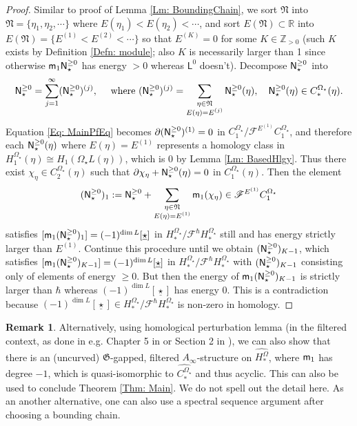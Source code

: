 \documentclass[10pt]{amsart}
\numberwithin{equation}{section}
\theoremstyle{plain}
\theoremstyle{definition}
\newtheorem{remark}[theorem]{Remark}
\theoremstyle{remark}
\numberwithin{equation}{section}
\newcommand{\R}{\mathbb{R}}
\newcommand{\Z}{\mathbb{Z}}
\newcommand{\wh}[1]{\widehat{#1}}
\newcommand{\mf}[1]{\mathfrak{#1}}
\newcommand{\ms}[1]{\mathscr{#1}}
\newcommand{\CBa}{C_*^{\Omega_\star}}
\newcommand{\HBa}{H_*^{\Omega_\star}}
\newcommand{\Cba}[1]{C_{#1}^{\Omega_\star}}
\newcommand{\Hba}[1]{H_{#1}^{\Omega_\star}}
\newcommand{\mm}{\textup{\textsf{m}}}
\newcommand{\NNN}{\textup{\textsf{N}}_\star}
\newcommand{\LL}{\textsf{L}}
\begin{document}
{\begin{proof}
	
	Similar to proof of Lemma \ref{Lm: BoundingChain}, we sort $\mf{N}$ into $\mf{N}=\{\eta_1,\eta_2,\cdots\}$ where $E(\eta_1)<E(\eta_2)<\cdots$, and sort $E(\mf{N})\subset \R$ into $E(\mf{N}) = \{E^{(1)}<E^{(2)}<\cdots \}$ so that $E^{(K)}=0$ for some $K\in\Z_{>0}$ (such $K$ exists by Definition \ref{Defn: module}; also $K$ is necessarily larger than 1 since otherwise $\mm_1\NNN^{\geq 0}$ has energy $>0$ whereas $\LL^0$ doesn't).
	Decompose $\NNN^{\geq 0}$ into \begin{align*}
		\NNN^{\geq 0} = \sum_{j=1}^\infty (\NNN^{\geq 0})^{(j)},\quad 
		\textup{ where } (\NNN^{\geq 0})^{(j)}= \sum_{\substack{\eta\in \mf{N} \\ E(\eta) = E^{(j)}}}\NNN^{\geq 0}(\eta),\quad \NNN^{\geq 0}(\eta)\in \CBa(\eta). 
	\end{align*}
	Equation \eqref{Eq: MainPfEq} becomes $\partial (\NNN^{\geq 0})^{(1)}=0$ in $\Cba{1}/\ms{F}^{E^{(1)}} \Cba{1}$, 
	and therefore each $\NNN^{\geq 0}(\eta)$ where $E(\eta)=E^{(1)}$ represents a homology class in $\Hba{1}(\eta)\cong H_1(\Omega_\star L(\eta))$, which is 0 by Lemma \ref{Lm: BasedHlgy}. 
	Thus there exist $\chi_\eta\in \Cba{2}(\eta)$ such that $\partial \chi_\eta + \NNN^{\geq 0}(\eta)=0$ in $\Cba{1}(\eta)$. 
	Then the element
	\[ (\NNN^{\geq 0})_{1}:=\NNN^{\geq 0} + \sum_{\substack{\eta \in \mf{N}\\ E(\eta) = E^{(1)}}} \mm_1(\chi_\eta) \in \ms{F}^{E^{(1)}}\Cba{1}  \]
	satisfies $[\mm_1(\NNN^{\geq 0})_1] = (-1)^{\dim L} [\underline{\star}]$ in $\HBa/\ms{F}^\hbar\HBa$ still and has energy strictly larger than $E^{(1)}$.  
	Continue this procedure until we obtain $(\NNN^{\geq 0})_{K-1}$, which satisfies $[\mm_1(\NNN^{\geq 0})_{K-1}] = (-1)^{\dim L} [\underline{\star}]$ in $\HBa/\ms{F}^\hbar\HBa$ with $(\NNN^{\geq 0})_{K-1}$ consisting only of elements of energy $\geq 0$. But then the energy of $\mm_1(\NNN^{\geq 0})_{K-1}$ is strictly larger than $\hbar$ whereas $(-1)^{\dim L} [\underline{\star}]$ has energy 0.
	This is a contradiction because $(-1)^{\dim L} [\underline{\star}]\in \HBa/\ms{F}^\hbar \HBa$ is non-zero in homology.
\end{proof}


\begin{remark}
	Alternatively, using homological perturbation lemma (in the filtered context, as done in e.g. Chapter 5 in \cite{FOOO1} or Section 2 in \cite{Irie2}), we can also show that there is an (uncurved) $\mathfrak{G}$-gapped, filtered $A_\infty$-structure on $\wh{H_*^\Omega}$, where $\mm_1$ has degree $-1$, which is quasi-isomorphic to $\wh{\CBa}$ and thus acyclic. This can also be used to conclude Theorem \ref{Thm: Main}. We do not spell out the detail here.
	As an another alternative, one can also use a spectral sequence argument after choosing a bounding chain.
\end{remark}


}
\end{document}
